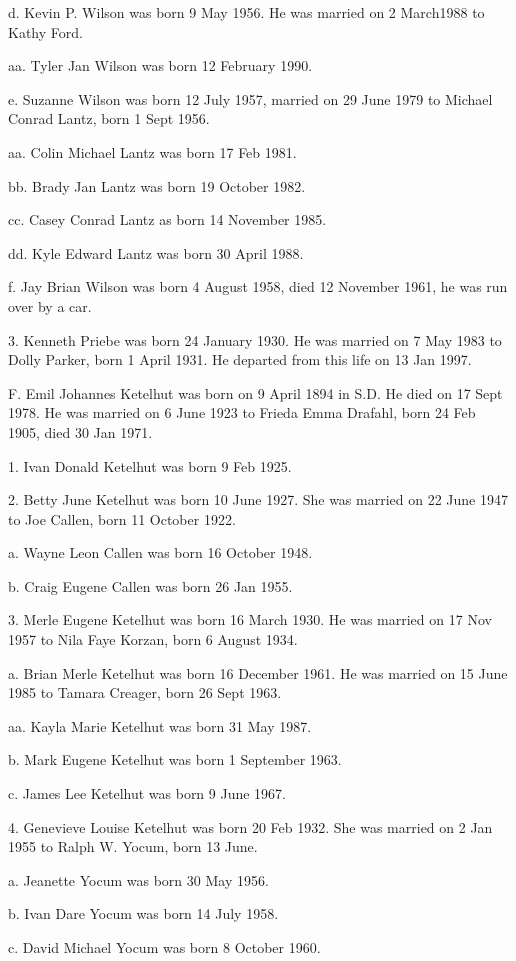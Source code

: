 \documentclass[a4paper]{article}
\begin{document}
d. Kevin P. Wilson was born 9 May 1956.  He was married on 2 March1988 to Kathy Ford.

aa. Tyler Jan Wilson was born 12 February 1990.

e. Suzanne Wilson was born 12 July 1957, married on 29 June 1979 to Michael Conrad Lantz, born 1 Sept 1956.

aa. Colin Michael Lantz was born 17 Feb 1981.

bb. Brady Jan Lantz was born 19 October 1982.

cc. Casey Conrad Lantz as born 14 November 1985.

dd. Kyle Edward Lantz was born 30 April 1988.

f. Jay Brian Wilson was born 4 August 1958, died 12 November 1961, he was run over by  a car.

3.  Kenneth Priebe was born 24 January 1930.  He was married on 7 May 1983 to Dolly Parker, born 1 April 1931.  He departed from this life on 13 Jan 1997.

F. Emil Johannes Ketelhut was born on 9 April 1894 in S.D.  He died on 17 Sept 1978. He was married on 6 June 1923 to Frieda Emma Drafahl, born 24 Feb 1905, died 30 Jan 1971.

1. Ivan Donald Ketelhut was born 9 Feb 1925.

2. Betty June Ketelhut was born 10 June 1927.  She was married on 22 June 1947 to Joe Callen, born 11 October 1922.

a. Wayne Leon Callen was born 16 October 1948.

b. Craig Eugene Callen was born 26 Jan 1955.

3. Merle Eugene Ketelhut was born 16 March 1930. He was married on 17 Nov 1957 to Nila Faye Korzan, born 6 August 1934.

a. Brian Merle Ketelhut was born 16 December 1961.  He was married on 15 June 1985 to Tamara Creager, born 26 Sept 1963.

aa. Kayla Marie Ketelhut was born 31 May 1987.

b. Mark Eugene Ketelhut was born 1 September 1963.

c. James Lee Ketelhut was born 9 June 1967.

4. Genevieve Louise Ketelhut was born 20 Feb 1932.  She was married on 2 Jan 1955 to Ralph W. Yocum, born 13 June.

a. Jeanette Yocum was born 30 May 1956.

b. Ivan Dare Yocum was born 14 July 1958.

c. David Michael Yocum was born 8 October 1960.
\end{document}
